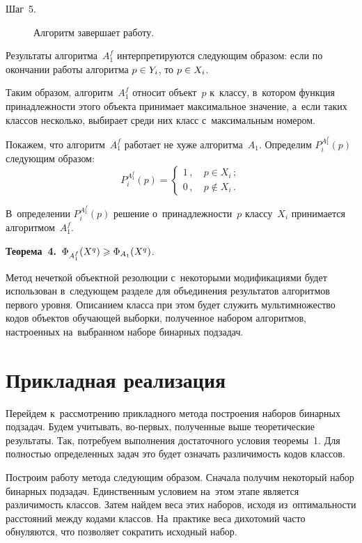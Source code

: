 \begin{multicols}{2}
\begin{description}
\item[Шаг~5.] Алгоритм завершает работу.

\end{description}

Результаты алгоритма~$ A_{1}^{f}$ интерпретируются следующим образом: если 
по окончании работы алгоритма $p \hm\in Y_{i}$, то $p \hm\in X_{i}$.

Таким образом, алгоритм~$ A_{1}^{f}$ относит объект~$p$ к~классу, 
в~котором функция принадлежности этого объекта принимает максимальное значение, 
а~если таких классов несколько, выбирает среди них класс с~максимальным номером.

Покажем, что алгоритм~$ A_{1}^{f} $ работает не хуже алгоритма~$A_{1}$.
Определим $ P_{i}^{A_{1}^{f}}(p) $ следующим образом:
$$
 P_{i}^{A_{1}^{f}}(p) = \begin{cases}
1\,, &\ p \in X_{i}\,; \\
0\,, &\ p \notin X_{i}\,.
\end{cases} 
$$

В~определении $ P_{i}^{A_{1}^{f}}(p)$ решение о~принадлеж\-ности~$p$ 
классу~$X_{i}$ принимается алгоритмом~$A_{1}^{f}$.


\smallskip

\noindent
\textbf{Теорема~4.}\
$\Phi_{A_{1}^{f}}(X^{q}) \hm\geqslant \Phi_{A_{1}}(X^{q})$.

\smallskip


Метод нечеткой объектной резолюции с~некоторыми модификациями будет 
использован в~сле\-ду\-ющем разделе для объединения результатов алгоритмов первого уровня.
Описанием класса при этом будет служить мультимножество кодов 
объектов обучающей выборки, полученное набором алгоритмов, 
настроенных на~выбранном наборе бинарных подзадач.

\section{Прикладная реализация}

Перейдем к~рассмотрению прикладного метода построения наборов бинарных подзадач.
Будем учитывать, во-первых, полученные выше теоретические результаты.
Так, потребуем выполнения достаточного условия теоремы~1.
Для полностью определенных задач это будет означать различимость кодов классов.

Построим работу метода следующим образом.
Сначала получим некоторый набор бинарных подзадач.
Единственным условием на~этом этапе является различимость классов.
Затем найдем веса этих наборов, исходя из~оптимальности рас\-сто\-яний между 
кодами классов.
На~практике веса дихотомий часто обнуляются, что позволяет сократить исходный набор.


\end{multicols}
